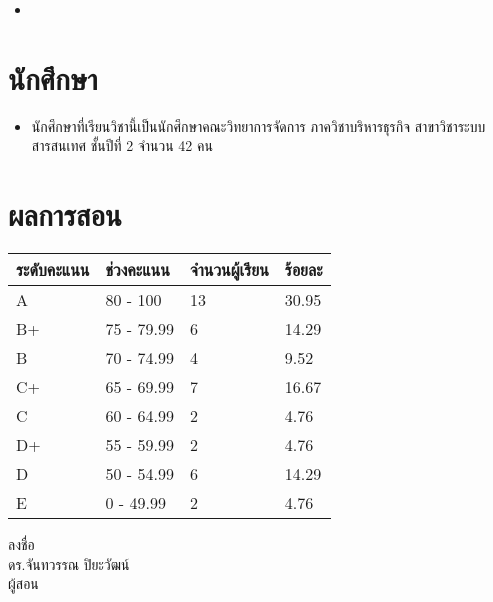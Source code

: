 \begin{tcolorbox}[breakable,enhanced,fonttitle=\bfseries]
\begin{itemize}
	\item
\end{itemize}
\end{tcolorbox}
\vspace{1.5cm}

\section*{นักศึกษา}

\begin{tcolorbox}[breakable,enhanced,fonttitle=\bfseries]
\begin{itemize}
\item นักศึกษาที่เรียนวิชานี้เป็นนักศึกษาคณะวิทยาการจัดการ ภาควิชาบริหารธุรกิจ สาขาวิชาระบบสารสนเทศ ชั้นปีที่ 2 จำนวน 42 คน
\end{itemize}
\end{tcolorbox}
\vspace{1.5cm}

\section*{ผลการสอน}

\begin{table}[H]
\centering
\begin{tabu}{l l l l}
 \hline
 ระดับคะแนน & ช่วงคะแนน & จำนวนผู้เรียน & ร้อยละ \\ [0.5ex] 
 \hline
A & 80 - 100 & 13 & 30.95 \\
B+  & 75 - 79.99  & 6 & 14.29 \\
B  & 70 - 74.99  & 4 & 9.52 \\
C+ & 65 - 69.99 & 7 & 16.67 \\
C  & 60 - 64.99 & 2 & 4.76 \\
D+  & 55 - 59.99 & 2 & 4.76 \\
D  & 50 - 54.99 & 6 & 14.29 \\
E  & 0 - 49.99 & 2 & 4.76 \\
\end{tabu}
\end{table}


\vspace{10mm}
\noindent
ลงชื่อ\\
ดร.จันทวรรณ ปิยะวัฒน์\\
ผู้สอน



